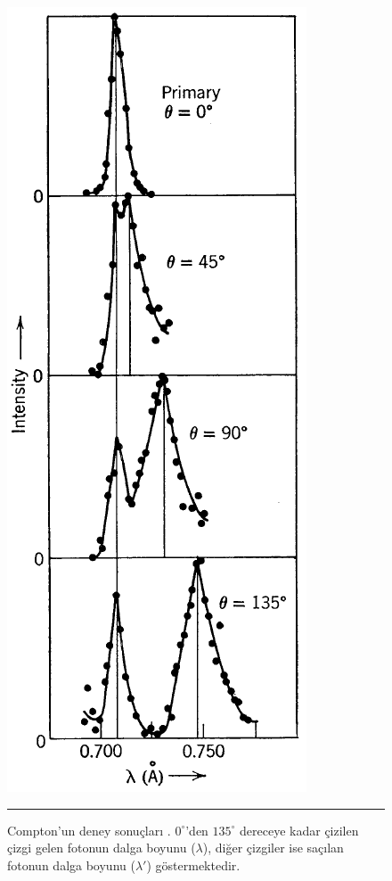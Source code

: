 \documentclass[a4paper,12pt, twoside]{article}
\begin{document}
\begin{figure}[hbtp]
\begin{minipage}{0.45\textwidth}
{\center
\includegraphics[scale=.8]{compton_exp_data.png}
\caption{Compton'un deney sonuçları \cite{book:EisbergResnick}. $0^\circ$'den $135^\circ$ dereceye kadar çizilen çizgi gelen fotonun dalga boyunu ($\lambda$), diğer çizgiler ise saçılan fotonun dalga boyunu ($\lambda'$) göstermektedir.}
\label{fig:compton_exp}}
\noindent\rule{.98\textwidth}{0.4pt}

\end{minipage}
\end{figure}
\end{document}
